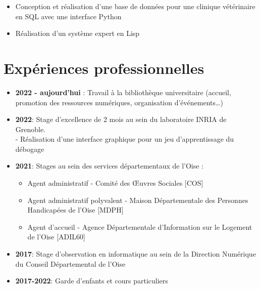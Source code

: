 \documentclass[9pt, oneside, a4paper, titlepage]{extarticle}
\begin{document}
\begin{tcolorbox}
\begin{minipage}[t]{12.8cm}
\begin{tcolorbox}[grow to right by = 0.6cm, colback = gray!25, colframe = white]
\begin{itemize}
                    \item Conception et réalisation d'une base de données pour une clinique vétérinaire en SQL avec une interface Python
                    
                    \item Réalisation d'un système expert en Lisp
                \end{itemize}
                
                \section*{Expériences professionnelles}
                \begin{itemize}
                    \item \textbf{2022 - aujourd'hui }: Travail à la bibliothèque universitaire (accueil, promotion des ressources numériques, organisation d'événements\ldots)
                    \item \textbf{2022}: Stage d'excellence de 2 mois au sein du laboratoire INRIA 
                    de Grenoble. \\   - Réalisation d'une 
                    interface graphique pour un jeu d'apprentissage
                    du débogage
                    \item \textbf{2021}: Stages au sein des services départementaux de l’Oise :
                    \begin{itemize}
                        \item Agent administratif - Comité des Œuvres Sociales [COS]
                        \item Agent administratif polyvalent - Maison Départementale des Personnes Handicapées de l’Oise [MDPH]
                        \item Agent d’accueil - Agence Départementale d’Information sur le Logement de l’Oise [ADIL60]

                    \end{itemize}
                    \item \textbf{2017}: Stage d’observation en informatique au sein de la Direction Numérique du Conseil Départemental de l'Oise
                    
                    \item \textbf{2017-2022}: Garde d’enfants et cours particuliers
                \end{itemize}


\end{tcolorbox}
\end{minipage}
\end{tcolorbox}
\end{document}

